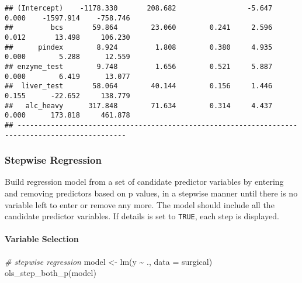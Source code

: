 \documentclass[
]{article}
\newenvironment{Shaded}{\begin{snugshade}}{\end{snugshade}}
\newcommand{\AttributeTok}[1]{\textcolor[rgb]{0.77,0.63,0.00}{#1}}
\newcommand{\CommentTok}[1]{\textcolor[rgb]{0.56,0.35,0.01}{\textit{#1}}}
\newcommand{\FunctionTok}[1]{\textcolor[rgb]{0.00,0.00,0.00}{#1}}
\newcommand{\NormalTok}[1]{#1}
\newcommand{\OtherTok}[1]{\textcolor[rgb]{0.56,0.35,0.01}{#1}}
\newcommand{\SpecialCharTok}[1]{\textcolor[rgb]{0.00,0.00,0.00}{#1}}
\begin{document}
\begin{verbatim}
## (Intercept)    -1178.330       208.682                 -5.647    0.000    -1597.914    -758.746 
##         bcs       59.864        23.060        0.241     2.596    0.012       13.498     106.230 
##      pindex        8.924         1.808        0.380     4.935    0.000        5.288      12.559 
## enzyme_test        9.748         1.656        0.521     5.887    0.000        6.419      13.077 
##  liver_test       58.064        40.144        0.156     1.446    0.155      -22.652     138.779 
##   alc_heavy      317.848        71.634        0.314     4.437    0.000      173.818     461.878 
## ------------------------------------------------------------------------------------------------
\end{verbatim}

\hypertarget{stepwise-regression-1}{%
\subsubsection{Stepwise Regression}\label{stepwise-regression-1}}

Build regression model from a set of candidate predictor variables by
entering and removing predictors based on p values, in a stepwise manner
until there is no variable left to enter or remove any more. The model
should include all the candidate predictor variables. If details is set
to \texttt{TRUE}, each step is displayed.

\hypertarget{variable-selection-3}{%
\paragraph{Variable Selection}\label{variable-selection-3}}

\begin{Shaded}
\begin{Highlighting}[]
\CommentTok{\# stepwise regression}
\NormalTok{model }\OtherTok{\textless{}{-}} \FunctionTok{lm}\NormalTok{(y }\SpecialCharTok{\textasciitilde{}}\NormalTok{ ., }\AttributeTok{data =}\NormalTok{ surgical)}
\FunctionTok{ols\_step\_both\_p}\NormalTok{(model)}
\end{Highlighting}
\end{Shaded}
\end{document}
